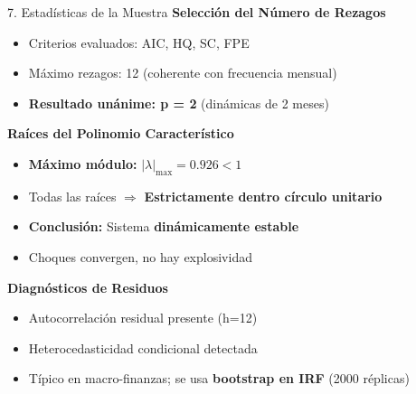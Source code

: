 \documentclass[spanish, 11pt]{beamer}
\begin{document}
\begin{frame}{7. Estadísticas de la Muestra}
\textbf{Selección del Número de Rezagos}
\begin{itemize}
  \item Criterios evaluados: AIC, HQ, SC, FPE
  \item Máximo rezagos: 12 (coherente con frecuencia mensual)
  \item \textbf{Resultado unánime: p = 2} (dinámicas de 2 meses)
\end{itemize}

\vspace{0.3cm}
\textbf{Raíces del Polinomio Característico}
\begin{itemize}
  \item \textbf{Máximo módulo:} $|\lambda|_{\max} = 0.926 < 1$
  \item Todas las raíces $\Rightarrow$ \textbf{Estrictamente dentro círculo unitario}
  \item \textbf{Conclusión:} Sistema \textbf{dinámicamente estable}
  \item Choques convergen, no hay explosividad
\end{itemize}

\vspace{0.3cm}
\textbf{Diagnósticos de Residuos}
\begin{itemize}
  \item Autocorrelación residual presente (h=12)
  \item Heterocedasticidad condicional detectada
  \item Típico en macro-finanzas; se usa \textbf{bootstrap en IRF} (2000 réplicas)
\end{itemize}
\end{frame}
\end{document}
